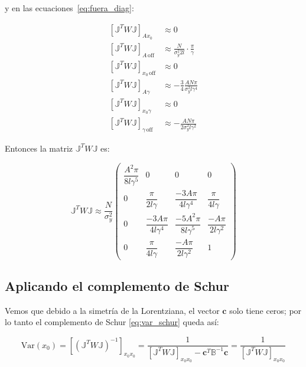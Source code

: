 y en las ecuaciones~\ref{eq:fuera_diag}:

\begin{align}
    \left[\mathbb{J}^T W \mathbb{J}\right]_{A x_0} &\approx 0 \\
    \left[\mathbb{J}^T W \mathbb{J}\right]_{A\,\text{off}} &\approx \frac{N}{\sigma_y^2 2l}\cdot\frac{\pi}{\gamma} \\
    \left[\mathbb{J}^T W \mathbb{J}\right]_{x_0\,\text{off}} &\approx 0 \\
    \left[\mathbb{J}^T W \mathbb{J}\right]_{A\gamma} &\approx -\frac{3}{4}\frac{AN\pi}{\sigma_y^2 l\gamma^4} \\
    \left[\mathbb{J}^T W \mathbb{J}\right]_{x_0\gamma} &\approx 0 \\
    \left[\mathbb{J}^T W \mathbb{J}\right]_{\gamma\,\text{off}} &\approx -\frac{AN\pi}{2\sigma_y^2 l\gamma^2}
\end{align}

Entonces la matriz $\mathbb{J}^T W \mathbb{J}$ es:

\begin{equation}
    \mathbb{J}^T W \mathbb{J} \approx \frac{N}{\sigma_y^2}
    \begin{pmatrix}
        \dfrac{A^2\pi}{8l\gamma^5} & 0 & 0 & 0 \\[10pt]
        0 & \dfrac{\pi}{2l\gamma} & \dfrac{-3A\pi}{4l\gamma^4} & \dfrac{\pi}{4l\gamma} \\[10pt]
        0 & \dfrac{-3A\pi}{4l\gamma^4} & \dfrac{-5A^2\pi}{8l\gamma^5} & \dfrac{-A\pi}{2l\gamma^2} \\[10pt]
        0 & \dfrac{\pi}{4l\gamma} & \dfrac{-A\pi}{2l\gamma^2} & 1
    \end{pmatrix}
    \label{eq:matrizfinal}
\end{equation}

\subsection{Aplicando el complemento de Schur}

Vemos que debido a la simetría de la Lorentziana, el vector $\mathbf{c}$ solo tiene ceros; por lo tanto el complemento de Schur \eqref{eq:var_schur} queda así:

\begin{equation}
    \mathrm{Var}(x_0) = \left[\left(\mathbb{J}^T W \mathbb{J}\right)^{-1}\right]_{x_0 x_0}
    = \frac{1}{\left[\mathbb{J}^T W \mathbb{J}\right]_{x_0 x_0} - \mathbf{c}^T \mathbb{B}^{-1} \mathbf{c}}
    = \frac{1}{\left[\mathbb{J}^T W \mathbb{J}\right]_{x_0 x_0}}
\end{equation}

